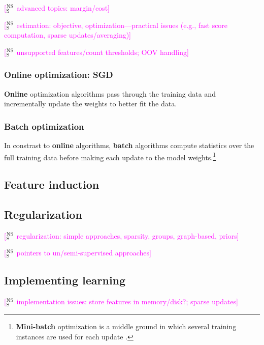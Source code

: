 \documentclass[11pt,letterpaper]{article}
\newcommand{\ensuretext}[1]{#1}
\newcommand{\nssmarker}{\ensuretext{\textcolor{magenta}{\ensuremath{^{\textsc{NS}}_{\textsc{S}}}}}}
\newcommand{\arkcomment}[3]{\ensuretext{\textcolor{#3}{[#1 #2]}}}
\newcommand{\nss}[1]{\arkcomment{\nssmarker}{#1}{magenta}}
\begin{document}
\nss{advanced topics: margin/cost}

\nss{estimation: objective, optimization---practical issues (e.g., fast score computation, sparse updates/averaging)}

\nss{unsupported features/count thresholds; OOV handling}

\subsubsection{Online optimization: SGD}

\textbf{Online} optimization algorithms pass through the training data and incrementally update 
the weights to better fit the data.

\subsubsection{Batch optimization}

In constrast to \textbf{online} algorithms, 
\textbf{batch} algorithms compute statistics over the full training data 
before making each update to the model weights.\footnote{\textbf{Mini-batch} optimization is a middle ground in which several training instances are used for each update \citep[p. 175]{smith}.}

\subsection{Feature induction}\label{sec:induction}

\subsection{Regularization}\label{sec:reg}

\nss{regularization: simple approaches, sparsity, groups, graph-based, priors}

\nss{pointers to un/semi-supervised approaches}

\subsection{Implementing learning}

\nss{implementation issues: store features in memory/disk?; sparse updates}
\end{document}
